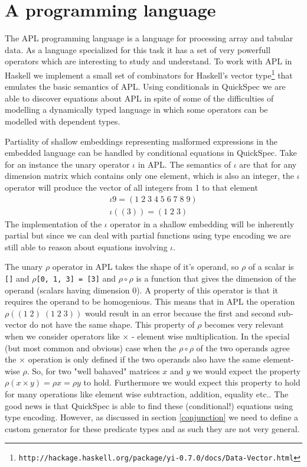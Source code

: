 \section{A programming language}\label{apl}
The APL programming language \cite{Iverson1962}
is a language for processing array and tabular data.
As a language specialized for this task it has a set of very powerfull
operators which are interesting to study and understand.
To work with APL in Haskell we implement a small
set of combinators for Haskell's vector
type\footnote{\texttt{http://hackage.haskell.org/package/yi-0.7.0/docs/Data-Vector.html}}
that emulates the basic semantics of APL.
Using conditionals in QuickSpec we are able to discover
equations about APL in spite of some of the
difficulties of modelling a dynamically typed language
in which some operators can be modelled with dependent types.

Partiality of shallow embeddings representing malformed expressions in the
embedded language can be handled by conditional equations in QuickSpec.
Take for an instance the unary operator $\iota$ in APL. The semantics
of $\iota$ are that for any dimension matrix which contains only one element, which is also
an integer, the $\iota$ operator will produce the vector of all integers from 1 to that element
\begin{gather*}
    \iota 9 = (1\;2\;3\;4\;5\;6\;7\;8\;9)\\
    \iota ((3)) = (1\;2\;3)
\end{gather*}
The implementation of the $\iota$ operator in a shallow embedding will be inherently partial
but since we can deal with partial functions using type encoding we are still able to reason
about equations involving $\iota$.

The unary $\rho$ operator in APL takes the shape of it's operand,
so $\rho$ of a scalar is \texttt{[]} 
and $\rho$\texttt{[0, 1, 3] = [3]} and
$\rho\circ\rho$ is a function that gives the dimension of the operand (scalars having dimension 0).
A property of this operator is that it requires the operand to be homogenious.
This means that in APL the operation $\rho((1\;2)\;(1\;2\;3))$
would result in an error because the first and second sub-vector do not have the same shape.
This property of $\rho$ becomes very relevant when we consider operators like $\times$ - element wise
multiplication. In the special (but most common and obvious) case
when the $\rho\circ\rho$ of the two operands agree the $\times$ operation
is only defined if the two operands also have the same element-wise $\rho$. So, for two "well bahaved" matrices
$x$ and $y$ we would expect the property $\rho(x \times y) = \rho x = \rho y$ to hold. Furthermore
we would expect this property to hold for many operations like element wise subtraction, addition, equality etc..
The good news is that QuickSpec is able to find these (conditional!) equations using type encoding. However,
as discussed in section \ref{conjunction} we need to define a custom generator for these predicate types
and as such they are not very general.
